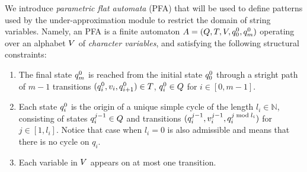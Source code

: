 \documentclass[sigplan,review,anonymous]{acmart}\settopmatter{printfolios=true,printccs=false,printacmref=false}
\begin{document}
We introduce \emph{parametric flat automata} (PFA) that will be used to define patterns 
used by the under-approximation module to restrict the domain of string variables. 
Namely, an PFA is a finite automaton $A = (Q,T,V,q_{0}^{0},q_{m}^{0})$ operating over an alphabet $V$ of \emph{character variables}, 
and satisfying the following structural constraints:
\begin{enumerate}
	\item The final state $q_{m}^{0}$ is reached from  the initial state $q_{0}^{0}$ through a stright path of $m-1$ transitions $(q_{i}^{0},v_i,q_{i+1}^{0}) \in T$, $q_{i}^{0} \in Q$ for $i\in[0,m-1]$. %
	\item  
Each state $q_{i}^{0}$ is the origin of a unique simple cycle of the length $l_i\in\mathbb{N}$, consisting of states $q_{i}^{j-1} \in Q$ and transitions $(q_{i}^{j-1}, v_{i}^{j-1}, q_{i}^{j \bmod l_i})$ for $j\in [1,l_i]$. 
Notice that case when $l_i = 0$ is also admissible and means that there is no cycle on $q_i$.
	\item Each variable in $V$ appears on at most one transition.%
\end{enumerate} 
\end{document}
